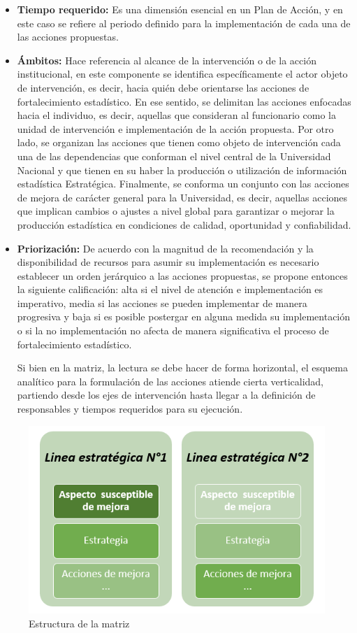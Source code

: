 \documentclass[
]{book}
\begin{document}
\begin{itemize}
\item
  \textbf{Tiempo requerido:} Es una dimensión esencial en un Plan de Acción, y en este caso se refiere al periodo definido para la implementación de cada una de las acciones propuestas.
\item
  \textbf{Ámbitos:} Hace referencia al alcance de la intervención o de la acción institucional, en este componente se identifica específicamente el actor objeto de intervención, es decir, hacia quién debe orientarse las acciones de fortalecimiento estadístico. En ese sentido, se delimitan las acciones enfocadas hacia el individuo, es decir, aquellas que consideran al funcionario como la unidad de intervención e implementación de la acción propuesta. Por otro lado, se organizan las acciones que tienen como objeto de intervención cada una de las dependencias que conforman el nivel central de la Universidad Nacional y que tienen en su haber la producción o utilización de información estadística Estratégica. Finalmente, se conforma un conjunto con las acciones de mejora de carácter general para la Universidad, es decir, aquellas acciones que implican cambios o ajustes a nivel global para garantizar o mejorar la producción estadística en condiciones de calidad, oportunidad y confiabilidad.
\item
  \textbf{Priorización:} De acuerdo con la magnitud de la recomendación y la disponibilidad de recursos para asumir su implementación es necesario establecer un orden jerárquico a las acciones propuestas, se propone entonces la siguiente calificación: alta si el nivel de atención e implementación es imperativo, media si las acciones se pueden implementar de manera progresiva y baja si es posible postergar en alguna medida su implementación o si la no implementación no afecta de manera significativa el proceso de fortalecimiento estadístico.

  Si bien en la matriz, la lectura se debe hacer de
  forma horizontal, el esquema analítico para la
  formulación de las acciones atiende cierta
  verticalidad, partiendo desde los ejes de
  intervención hasta llegar a la definición de
  responsables y tiempos requeridos para su ejecución.
\end{itemize}

\begin{figure}

{\centering \includegraphics[width=0.6\linewidth]{Imagenes/diagrama} 

}

\caption{Estructura de la matriz}\label{fig:unnamed-chunk-53}
\end{figure}
\end{document}
